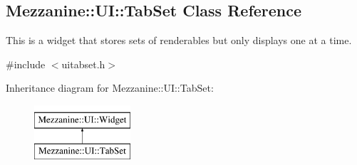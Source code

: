 \hypertarget{classMezzanine_1_1UI_1_1TabSet}{
\subsection{Mezzanine::UI::TabSet Class Reference}
\label{classMezzanine_1_1UI_1_1TabSet}
}


This is a widget that stores sets of renderables but only displays one at a time.  




{\ttfamily \#include $<$uitabset.h$>$}

Inheritance diagram for Mezzanine::UI::TabSet:\begin{figure}[H]
\begin{center}
\leavevmode
\includegraphics[height=2.000000cm]{classMezzanine_1_1UI_1_1TabSet}
\end{center}
\end{figure}
